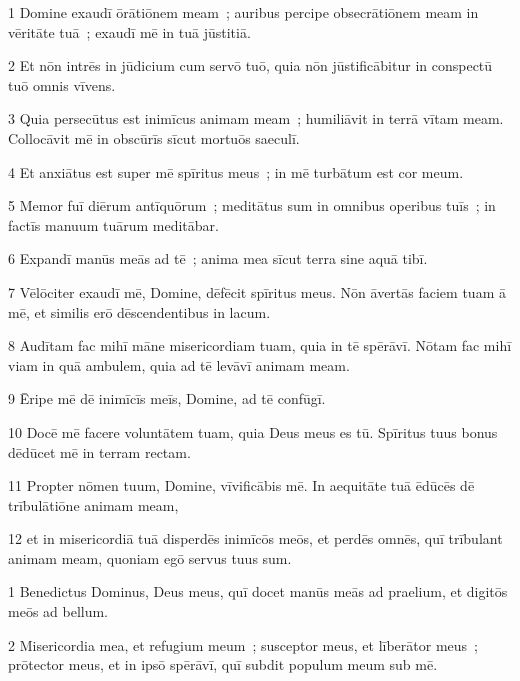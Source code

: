 
\psalmVerse
  {\phantom{00}1}
  {Domine exaudī ōrātiōnem meam~; auribus percipe obsecrātiōnem meam in vēritāte tuā~; exaudī mē in tuā jūstitiā.}


\psalmVerse
  {\phantom{00}2}
  {Et nōn intrēs in jūdicium cum servō tuō, quia nōn jūstificābitur in conspectū tuō omnis vīvens.}


\psalmVerse
  {\phantom{00}3}
  {Quia persecūtus est inimīcus animam meam~; humiliāvit in terrā vītam meam. Collocāvit mē in obscūrīs sīcut mortuōs saeculī.}


\psalmVerse
  {\phantom{00}4}
  {Et anxiātus est super mē spīritus meus~; in mē turbātum est cor meum.}


\psalmVerse
  {\phantom{00}5}
  {Memor fuī diērum antīquōrum~; meditātus sum in omnibus operibus tuīs~; in factīs manuum tuārum meditābar.}


\psalmVerse
  {\phantom{00}6}
  {Expandī manūs meās ad tē~; anima mea sīcut terra sine aquā tibī.}


\psalmVerse
  {\phantom{00}7}
  {Vēlōciter exaudī mē, Domine, dēfēcit spīritus meus. Nōn āvertās faciem tuam ā mē, et similis erō dēscendentibus in lacum.}


\psalmVerse
  {\phantom{00}8}
  {Audītam fac mihī māne misericordiam tuam, quia in tē spērāvī. Nōtam fac mihī viam in quā ambulem, quia ad tē levāvī animam meam.}


\psalmVerse
  {\phantom{00}9}
  {Ēripe mē dē inimīcīs meīs, Domine, ad tē confūgī.}


\psalmVerse
  {\phantom{0}10}
  {Docē mē facere voluntātem tuam, quia Deus meus es tū. Spīritus tuus bonus dēdūcet mē in terram rectam.}


\psalmVerse
  {\phantom{0}11}
  {Propter nōmen tuum, Domine, vīvificābis mē. In aequitāte tuā ēdūcēs dē trībulātiōne animam meam,}


\psalmVerse
  {\phantom{0}12}
  {et in misericordiā tuā disperdēs inimīcōs meōs, et perdēs omnēs, quī trībulant animam meam, quoniam egō servus tuus sum.}




\psalmVerse
  {\phantom{00}1}
  {Benedictus Dominus, Deus meus, quī docet manūs meās ad praelium, et digitōs meōs ad bellum.}


\psalmVerse
  {\phantom{00}2}
  {Misericordia mea, et refugium meum~; susceptor meus, et līberātor meus~; prōtector meus, et in ipsō spērāvī, quī subdit populum meum sub mē.}


